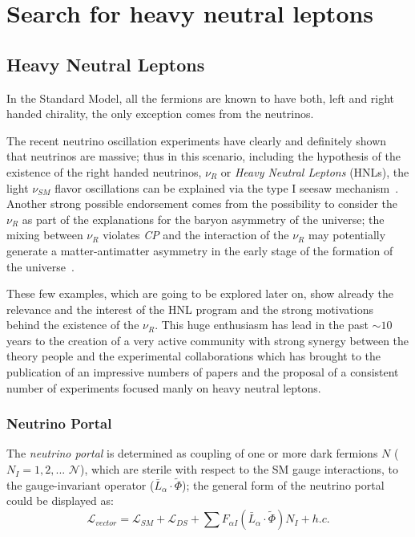 
\part {Search for heavy neutral leptons}


\chapter{Heavy Neutral Leptons} 
\label{Chapter3} 


In the Standard Model, all the fermions are known to have both, left and right handed chirality, the only exception comes from the neutrinos.

The recent neutrino oscillation experiments have clearly and definitely shown that neutrinos are massive; thus in this scenario, including the hypothesis of the existence of the right handed neutrinos, $\nu_{R}$ or \emph{Heavy Neutral Leptons} (HNLs), the light $\nu_{SM}$ flavor oscillations can be explained via the type I seesaw mechanism~\cite{MINKOWSKI1977421,gellmann2013complex,PhysRevLett.44.912,PhysRevD.22.2227}.
Another strong possible endorsement comes from the possibility to consider the $\nu_{R}$ as part of the explanations for the baryon asymmetry of the universe; the mixing between $\nu_{R}$ violates \emph{CP} and the interaction of the $\nu_{R}$ may potentially generate a matter-antimatter asymmetry in the early stage of the formation of the universe~\cite{Canetti_2012,KUZMIN198536}.

These few examples, which are going to be explored later on, show already the relevance and the interest of the HNL program and the strong motivations behind the existence of the $\nu_{R}$. This huge enthusiasm has lead in the past $\sim10$ years to the creation of a very active community with strong synergy between the theory people and the experimental collaborations which has brought to the publication of an impressive numbers of papers and the proposal of a consistent number of experiments focused manly on heavy neutral leptons. 

\section{Neutrino Portal} \label{sec:neutrinoPortal}
The \emph{neutrino portal} is determined as coupling of one or more dark fermions $N$ ($N_{I} = 1,2,...$ $\mathcal{N}$), which are sterile with respect to the SM gauge interactions, to the gauge-invariant operator ($\bar{L}_{\alpha}  \cdot \widetilde \Phi$); the general form of the neutrino portal could be displayed as: 
\begin{equation}
\label{eq:neutrinoportal}
\mathcal{L}_{vector} = \mathcal{L}_{SM} + \mathcal{L}_{DS} + \sum F_{\alpha I} (\bar{L}_{\alpha}  \cdot \widetilde \Phi)N_{I} + h.c.
\end{equation}

